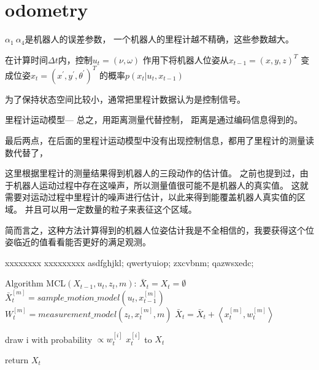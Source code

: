 \section{odometry}

$\alpha_1 ~ \alpha_4$是机器人的误差参数，
一个机器人的里程计越不精确，这些参数越大。



在计算时间$\Delta t$内，控制$u_t = (\nu, \omega)$ 作用下将机器人位姿从$x_{t-1} = (x, y, z)^T$ 
变成位姿$x_t = (x^\prime, y^\prime, \theta^\prime)^T$ 的概率$p(x_t | u_t, x_{t-1})$ 

为了保持状态空间比较小，通常把里程计数据认为是控制信号。

里程计运动模型---
总之，用距离测量代替控制， 距离是通过编码信息得到的。

最后两点，在后面的里程计运动模型中没有出现控制信息，都用了里程计的测量读数代替了，


这里根据里程计的测量结果得到机器人的三段动作的估计值。
之前也提到过，由于机器人运动过程中存在这噪声，所以测量值很可能不是机器人的真实值。
这就需要对运动过程中里程计的噪声进行估计，以此来得到能覆盖机器人真实值的区域。
并且可以用一定数量的粒子来表征这个区域。

简而言之，这种方法计算得到的机器人位姿估计我是不全相信的，我要获得这个位姿临近的值看看能否更好的满足观测。



\begin{algorithm}[htb]  
  \label{alg:Framwork}  
  \begin{algorithmic}  
    \Require  
    xxxxxxxx 
    \Ensure  
   xxxxxxxxx
      \State asdfghjkl;
      \Else
      \State qwertyuiop;
             \State zxcvbnm;
       \EndIf
      \EndIf
   \EndFor  
      \State qazwsxedc; 
    \EndFor
  \end{algorithmic}  
\end{algorithm}


\begin{algorithm} 
  \begin{algorithmic}[1]
      \State Algorithm MCL$(X_{t-1}, u_t, z_t, m)$:
      \State $\bar{X}_t = X_t = \emptyset$
          \State $\bar{X}_t^{[m]} = sample\_motion\_model(u_t, x_{t-1}^{[m]})$ 
          \State $W_t^{[m]} = measurement\_model(z_t, x_t ^{[m]}, m)$
          \State $\bar{X}_t = \bar{X}_t +\left \langle x_t ^{[m]}, w_t ^{[m]} \right \rangle $
      \EndFor

              \State draw i with probability $\propto w_t ^{[i]}$ 
              \State $x_t ^{[i]} $ to $X_t$ 
          \EndFor

          \State return $X_t$
  \end{algorithmic}
\end{algorithm}


